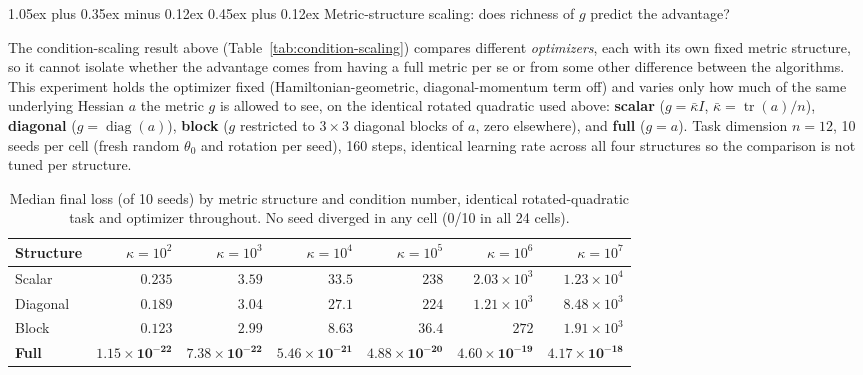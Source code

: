 \documentclass[10pt,twocolumn]{article}
\makeatletter
\renewcommand\subsection{\@startsection{subsection}{2}{0pt}%
  {1.05ex plus 0.35ex minus 0.12ex}%
  {0.45ex plus 0.12ex}%
  {\normalsize\bfseries}}
\makeatother
\begin{document}
\subsection{Metric-structure scaling: does richness of
\texorpdfstring{$g$}{g} predict the advantage?}
\label{sec:metric-structure-scaling}

The condition-scaling result above (Table~\ref{tab:condition-scaling}) compares
different \emph{optimizers}, each with its own fixed metric structure, so it
cannot isolate whether the advantage comes from having a full metric per se or
from some other difference between the algorithms. This experiment holds the
optimizer fixed (Hamiltonian-geometric, diagonal-momentum term off) and varies
only how much of the same underlying Hessian $a$ the metric $g$ is allowed to
see, on the identical rotated quadratic used above: \textbf{scalar}
($g=\bar\kappa I$, $\bar\kappa=\operatorname{tr}(a)/n$), \textbf{diagonal}
($g=\operatorname{diag}(a)$), \textbf{block} ($g$ restricted to $3\times3$
diagonal blocks of $a$, zero elsewhere), and \textbf{full} ($g=a$). Task
dimension $n=12$, 10 seeds per cell (fresh random $\theta_0$ and rotation per
seed), 160 steps, identical learning rate across all four structures so the
comparison is not tuned per structure.

\begin{table}[t]
\centering
\caption{Median final loss (of 10 seeds) by metric structure and condition
number, identical rotated-quadratic task and optimizer throughout. No seed
diverged in any cell (0/10 in all 24 cells).}
\label{tab:metric-structure-scaling}
\begin{tabular}{@{}lrrrrrr@{}}
\toprule
Structure & $\kappa=10^2$ & $\kappa=10^3$ & $\kappa=10^4$ & $\kappa=10^5$ & $\kappa=10^6$ & $\kappa=10^7$ \\
\midrule
Scalar   & $0.235$ & $3.59$ & $33.5$ & $238$ & $2.03\times10^3$ & $1.23\times10^4$ \\
Diagonal & $0.189$ & $3.04$ & $27.1$ & $224$ & $1.21\times10^3$ & $8.48\times10^3$ \\
Block    & $0.123$ & $2.99$ & $8.63$ & $36.4$ & $272$ & $1.91\times10^3$ \\
\textbf{Full} & $\mathbf{1.15\times10^{-22}}$ & $\mathbf{7.38\times10^{-22}}$ & $\mathbf{5.46\times10^{-21}}$ & $\mathbf{4.88\times10^{-20}}$ & $\mathbf{4.60\times10^{-19}}$ & $\mathbf{4.17\times10^{-18}}$ \\
\bottomrule
\end{tabular}
\end{table}
\end{document}
